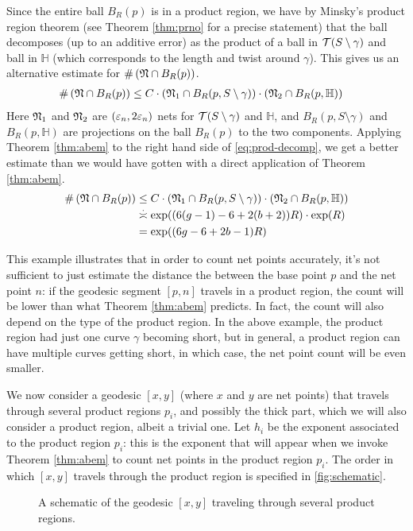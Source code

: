 Since the entire ball $B_R(p)$ is in a product region, we have by Minsky's product region theorem (see Theorem \ref{thm:prno} for a precise statement) that the ball decomposes (up to an additive error) as the
product of a ball in $\mathcal{T}(S \setminus \gamma)$ and ball in $\mathbb{H}$ (which corresponds to the length and twist around $\gamma$).
This gives us an alternative estimate for $\#\left( \mathfrak{N} \cap B_R(p)\right)$.
\begin{align}
  \label{eq:prod-decomp}
  \#\left( \mathfrak{N} \cap B_R(p) \right) &\leq C \cdot \left( \mathfrak{N}_1 \cap B_R(p, S \setminus \gamma) \right) \cdot \left( \mathfrak{N}_2 \cap B_R(p, \mathbb{H})\right)
\end{align}
Here $\mathfrak{N}_1$ and $\mathfrak{N}_2$ are $(\varepsilon_n, 2\varepsilon_n)$ nets for $\mathcal{T}(S \setminus \gamma)$ and $\mathbb{H}$, and $B_R(p, S \setminus \gamma)$ and $B_R(p, \mathbb{H})$ are projections on the ball $B_R(p)$ to the two components.
Applying Theorem \ref{thm:abem} to the right hand side of \eqref{eq:prod-decomp}, we get a better estimate than we would have gotten with a direct application of Theorem \ref{thm:abem}.
\begin{align*}
  \#\left( \net \cap B_R(p) \right) &\leq C \cdot \left( \net_1 \cap B_R(p, S \setminus \gamma) \right) \cdot \left( \net_2 \cap B_R(p, \mathbb{H})\right) \\
                                           &\emul \exp((6(g-1)-6 + 2(b+2))R) \cdot \exp(R) \\
  &= \exp((6g-6+2b-1)R)
\end{align*}

This example illustrates that in order to count net points accurately, it's not sufficient to just estimate the distance the between the base point $p$ and the net point $n$: if the geodesic segment $[p, n]$ travels in a product region, the count will be lower than what Theorem \ref{thm:abem} predicts.
In fact, the count will also depend on the type of the product region.
In the above example, the product region had just one curve $\gamma$ becoming short, but in general, a product region can have multiple curves getting short, in which case, the net point count will be even smaller.

We now consider a geodesic $[x,y]$ (where $x$ and $y$ are net points) that travels through several product regions $p_i$, and possibly the thick part, which we will also consider a product region, albeit a trivial one.
Let $h_i$ be the exponent associated to the product region $p_i$: this is the exponent that will appear when we invoke Theorem \ref{thm:abem} to count net points in the product region $p_i$.
The order in which $[x, y]$ travels through the product region is specified in \autoref{fig:schematic}.
\begin{figure}[h]
  \centering
  \caption{A schematic of the geodesic $[x,y]$ traveling through several product regions.}
  \label{fig:schematic}
\end{figure}

